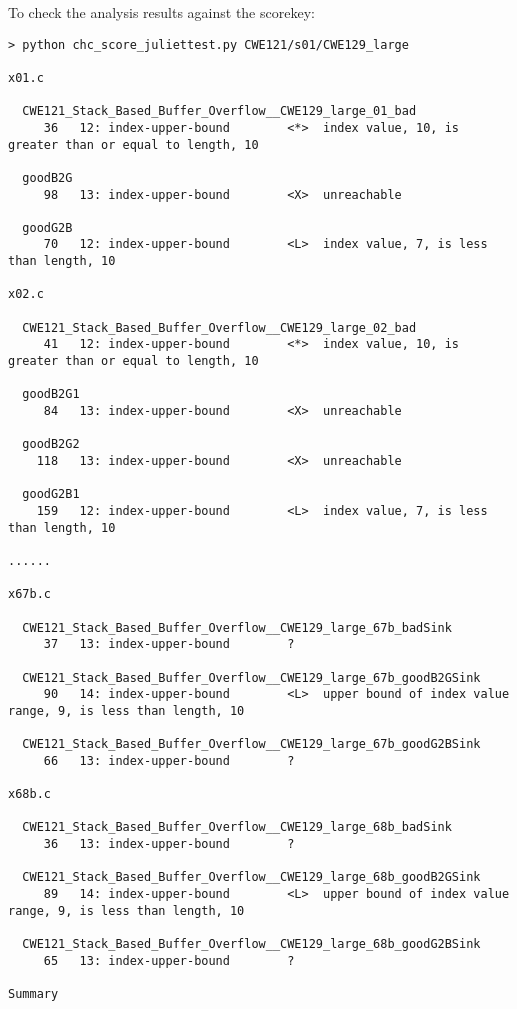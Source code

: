 \documentclass[11pt]{article}
\begin{document}
To check the analysis results against the scorekey:
\begin{small}
\begin{verbatim}
> python chc_score_juliettest.py CWE121/s01/CWE129_large

x01.c

  CWE121_Stack_Based_Buffer_Overflow__CWE129_large_01_bad
     36   12: index-upper-bound        <*>  index value, 10, is greater than or equal to length, 10

  goodB2G
     98   13: index-upper-bound        <X>  unreachable

  goodG2B
     70   12: index-upper-bound        <L>  index value, 7, is less than length, 10

x02.c

  CWE121_Stack_Based_Buffer_Overflow__CWE129_large_02_bad
     41   12: index-upper-bound        <*>  index value, 10, is greater than or equal to length, 10

  goodB2G1
     84   13: index-upper-bound        <X>  unreachable

  goodB2G2
    118   13: index-upper-bound        <X>  unreachable

  goodG2B1
    159   12: index-upper-bound        <L>  index value, 7, is less than length, 10

......

x67b.c

  CWE121_Stack_Based_Buffer_Overflow__CWE129_large_67b_badSink
     37   13: index-upper-bound        ?

  CWE121_Stack_Based_Buffer_Overflow__CWE129_large_67b_goodB2GSink
     90   14: index-upper-bound        <L>  upper bound of index value range, 9, is less than length, 10

  CWE121_Stack_Based_Buffer_Overflow__CWE129_large_67b_goodG2BSink
     66   13: index-upper-bound        ?

x68b.c

  CWE121_Stack_Based_Buffer_Overflow__CWE129_large_68b_badSink
     36   13: index-upper-bound        ?

  CWE121_Stack_Based_Buffer_Overflow__CWE129_large_68b_goodB2GSink
     89   14: index-upper-bound        <L>  upper bound of index value range, 9, is less than length, 10

  CWE121_Stack_Based_Buffer_Overflow__CWE129_large_68b_goodG2BSink
     65   13: index-upper-bound        ?

Summary


\end{verbatim}
\end{small}
\end{document}
